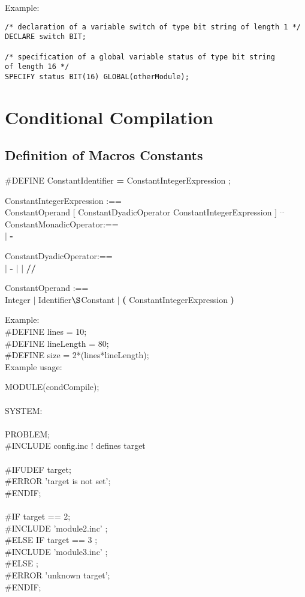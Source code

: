 Example:

\begin{lstlisting}
/* declaration of a variable switch of type bit string of length 1 */ 
DECLARE switch BIT;

/* specification of a global variable status of type bit string 
of length 16 */ 
SPECIFY status BIT(16) GLOBAL(otherModule);
\end{lstlisting}


\section{Conditional Compilation}

\subsection{Definition of Macros Constants}
\#DEFINE ConstantIdentifier {\bf = } ConstantIntegerExpression ;

ConstantIntegerExpression :== \\
\x [ ConstantMonadicOperator ] ConstantOperand  [ 
 ConstantDyadicOperator ConstantIntegerExpression  ] $^{...}$\\

ConstantMonadicOperator:== \\
\x {\bf +} $\mid$ {\bf -}

ConstantDyadicOperator:== \\
\x {\bf +} $\mid$ {\bf -} $\mid$ {\bf *} $\mid$ {\bf // }

ConstantOperand :== \\
\x Integer $\mid$ Identifier$\S $Constant $\mid$ 
{\bf (} ConstantIntegerExpression {\bf )}

Example:\\
\#DEFINE lines = 10;			\\
\#DEFINE lineLength = 80;		\\
\#DEFINE size = 2*(lines*lineLength);	\\

Example usage:

MODULE(condCompile);\\
\\
SYSTEM:\\
\ \\
PROBLEM;\\
\#INCLUDE config.inc    ! defines target\\
\ \\
\#IFUDEF target;\\
\x \#ERROR 'target is not set';\\
\#ENDIF;\\
\\
\#IF target == 2;\\
\x  \#INCLUDE 'module2.inc' ;\\
\#ELSE IF target == 3 ;\\
\x   \#INCLUDE 'module3.inc' ;\\
\#ELSE ;\\
\x   \#ERROR 'unknown target';\\
\#ENDIF;\\

